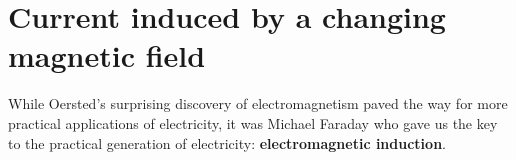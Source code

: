 {\section{Current induced by a changing magnetic field}

While Oersted's surprising discovery of electromagnetism paved the
way for more practical applications of electricity, it was Michael
Faraday who gave us the key to the practical generation of
electricity: \textbf{electromagnetic induction}.

}
